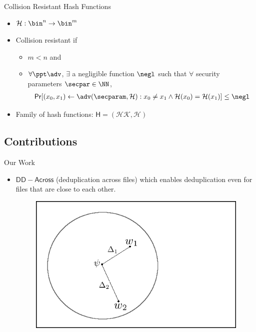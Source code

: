 \documentclass{beamer}
\newcommand{\scheme}{\mathsf{DD-Across}}
\begin{document}
\begin{frame}{Collision Resistant Hash Functions}
	\begin{itemize}
		\setlength\itemsep{1em}
		\item $\mathcal{H}: \bin^n \rightarrow \bin^m$
		\item Collision resistant if 
		 \begin{itemize}
        \item $m < n$ and
        \item $\forall \ppt \adv$, $\exists$ a negligible function $\negl$ such that $\forall$ security parameters $\secpar \in \NN$,
            \begin{multline*}
            \mathsf{Pr} [ ( x_0, x_1) \leftarrow \adv ( \secparam, \mathcal{H} ): 
x_0 \neq x_1 \wedge \mathcal{H} ( x_0 ) = \mathcal{H}(x_1) ] \leq \negl
            \end{multline*}
    \end{itemize}
        \item Family of hash functions: $\mathsf{H} = ( \mathcal{HK, H} )$
	\end{itemize}
\end{frame}

\subsection{Contributions}

\begin{frame}{Our Work}
	\begin{itemize}
		\setlength\itemsep{1em}
		\item $\scheme$ (deduplication across files) which enables deduplication even for files that are close to
	each other.
	    \begin{figure}[H]
	\includegraphics[scale=0.35]{example.png}
	\label{fig:example}
	\end{figure}
	\end{itemize}
\end{frame}
\end{document}
